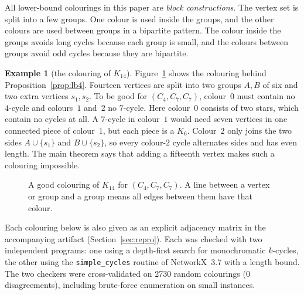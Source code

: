 \documentclass[11pt]{amsart}
\theoremstyle{definition}
\newtheorem{example}[theorem]{Example}
\theoremstyle{remark}
\begin{document}
All lower-bound colourings in this paper are \emph{block constructions}. The vertex set is split into a few groups. One colour is
used inside the groups, and the other colours are used between groups in a bipartite pattern. The colour inside the groups avoids
long cycles because each group is small, and the colours between groups avoid odd cycles because they are bipartite.

\begin{example}[the colouring of $K_{14}$]\label{ex:k14}
Figure~\ref{fig:k14} shows the colouring behind Proposition~\ref{prop:lb4}. Fourteen vertices are split into two groups $A,B$ of
six and two extra vertices $s_1,s_2$. To be good for $(C_4,C_7,C_7)$, colour~$0$ must contain no $4$-cycle and colours~$1$ and~$2$
no $7$-cycle. Here colour~$0$ consists of two stars, which contain no cycles at all. A $7$-cycle in colour~$1$ would need seven
vertices in one connected piece of colour~$1$, but each piece is a $K_6$. Colour~$2$ only joins the two sides
$A\cup\{s_1\}$ and $B\cup\{s_2\}$, so every colour-$2$ cycle alternates sides and has even length. The main theorem says that adding a
fifteenth vertex makes such a colouring impossible.
\end{example}

\begin{figure}[ht]
\centering
{}
\caption{A good colouring of $K_{14}$ for $(C_4,C_7,C_7)$. A line between a vertex or group and a group means all edges between
them have that colour.}\label{fig:k14}
\end{figure}

Each colouring below is also given as an explicit adjacency matrix in the accompanying artifact (Section~\ref{sec:repro}). Each
was checked with two independent programs: one using a depth-first search for monochromatic $k$-cycles, the other using the
\texttt{simple\_cycles} routine of NetworkX~3.7 with a length bound. The two checkers were cross-validated on 2730 random colourings
(0 disagreements), including brute-force enumeration on small instances.
\end{document}
